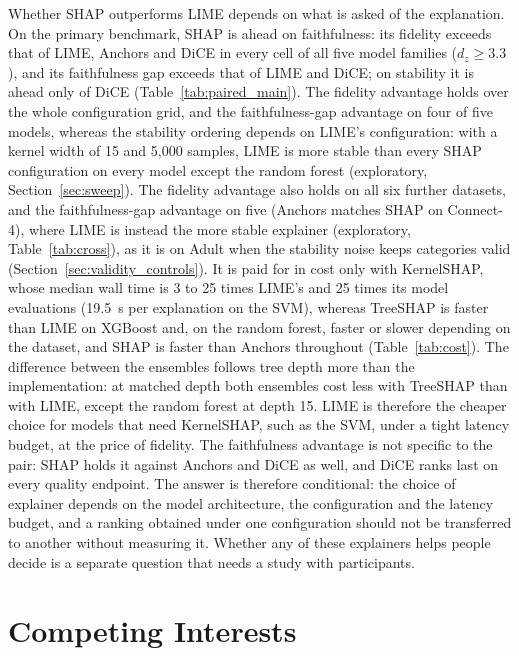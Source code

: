 \documentclass[11pt,a4paper]{article}
\begin{document}
Whether SHAP outperforms LIME depends on what is asked of the explanation.
On the primary benchmark,
SHAP is ahead on faithfulness: its fidelity exceeds that of LIME, Anchors
and DiCE in every cell of all five model families ($d_z \ge 3.3$), and its
faithfulness gap exceeds that of LIME and DiCE; on stability it is ahead
only of DiCE (Table~\ref{tab:paired_main}). The fidelity advantage holds over the whole configuration grid, and the
faithfulness-gap advantage on four of five models, whereas the stability
ordering depends on LIME's configuration: with a kernel width of 15 and 5,000
samples, LIME is more stable than every SHAP configuration on every model
except the random forest (exploratory, Section~\ref{sec:sweep}). The fidelity
advantage also holds on all six further datasets, and the faithfulness-gap
advantage on five (Anchors matches SHAP on Connect-4), where LIME is instead
the more stable explainer (exploratory, Table~\ref{tab:cross}), as it is
on Adult when the stability noise keeps categories valid
(Section~\ref{sec:validity_controls}). It is
paid for in cost only with KernelSHAP, whose median wall time is 3 to 25
times LIME's and 25 times its model evaluations (19.5~s per explanation on the
SVM), whereas TreeSHAP is faster than LIME on XGBoost and, on the random
forest, faster or slower depending on the dataset, and SHAP is faster than Anchors throughout
(Table~\ref{tab:cost}). The difference between the ensembles follows tree
depth more than the implementation: at matched depth both ensembles cost
less with TreeSHAP than with LIME, except the random forest at depth 15. LIME is therefore the cheaper choice for models that need
KernelSHAP, such as the SVM, under a tight latency budget, at the price of
fidelity. The faithfulness advantage is not specific to the pair: SHAP holds it
against Anchors and DiCE as well, and DiCE ranks last on every quality
endpoint. The
answer is therefore conditional: the choice of explainer depends on the
model architecture, the configuration and the latency budget, and a ranking
obtained under one configuration should not be transferred to another
without measuring it. Whether any of these explainers helps people decide
is a separate question that needs a study with participants.


\section*{Competing Interests}
\end{document}
